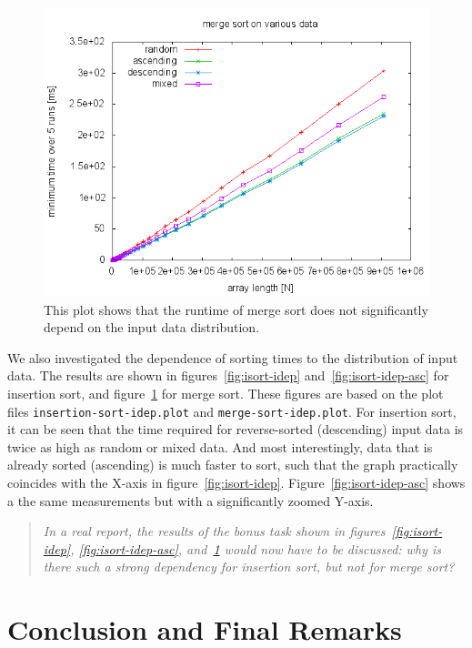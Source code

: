 \documentclass[a4paper,10pt]{article}
\begin{document}
\begin{figure}
  \centering
  \includegraphics[width=0.8\columnwidth]{../examples/msort-idep.png}
  \caption{
    This plot shows that the runtime of merge sort does not significantly depend on the input data distribution.
  }\label{fig:msort-idep}
\end{figure}

We also investigated the dependence of sorting times to the distribution of input data.
The results are shown in figures~\ref{fig:isort-idep} and~\ref{fig:isort-idep-asc} for insertion sort, and figure~\ref{fig:msort-idep} for merge sort.
These figures are based on the plot files \texttt{insertion-sort-idep.plot} and \texttt{merge-sort-idep.plot}.
For insertion sort, it can be seen that the time required for reverse-sorted (descending) input data is twice as high as random or mixed data.
And most interestingly, data that is already sorted (ascending) is much faster to sort, such that the graph practically coincides with the X-axis in figure~\ref{fig:isort-idep}.
Figure~\ref{fig:isort-idep-asc} shows a the same measurements but with a significantly zoomed Y-axis.

\begin{quotation}
  \itshape
  In a real report, the results of the bonus task shown in figures~\ref{fig:isort-idep}, \ref{fig:isort-idep-asc}, and~\ref{fig:msort-idep} would now have to be discussed:
  why is there such a strong dependency for insertion sort, but not for merge sort?
\end{quotation}



\clearpage
\section{Conclusion and Final Remarks}
\end{document}
